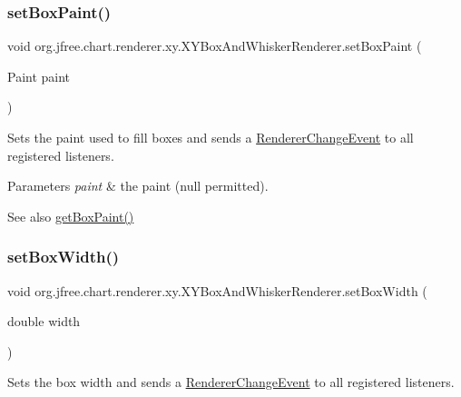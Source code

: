 \subsubsection{\texorpdfstring{set\+Box\+Paint()}{setBoxPaint()}}
{\footnotesize\ttfamily void org.\+jfree.\+chart.\+renderer.\+xy.\+X\+Y\+Box\+And\+Whisker\+Renderer.\+set\+Box\+Paint (\begin{DoxyParamCaption}\item[{Paint}]{paint }\end{DoxyParamCaption})}

Sets the paint used to fill boxes and sends a \mbox{\hyperlink{}{Renderer\+Change\+Event}} to all registered listeners.


\begin{DoxyParams}{Parameters}
{\em paint} & the paint ({\ttfamily null} permitted).\\
\hline
\end{DoxyParams}
\begin{DoxySeeAlso}{See also}
\mbox{\hyperlink{classorg_1_1jfree_1_1chart_1_1renderer_1_1xy_1_1_x_y_box_and_whisker_renderer_a0ee3c33a3c41cc5604874f12a26e16f7}{get\+Box\+Paint()}} 
\end{DoxySeeAlso}
\mbox{\label{classorg_1_1jfree_1_1chart_1_1renderer_1_1xy_1_1_x_y_box_and_whisker_renderer_a315ca989a335f58c5d08019fb3f519f8}} 
\subsubsection{\texorpdfstring{set\+Box\+Width()}{setBoxWidth()}}
{\footnotesize\ttfamily void org.\+jfree.\+chart.\+renderer.\+xy.\+X\+Y\+Box\+And\+Whisker\+Renderer.\+set\+Box\+Width (\begin{DoxyParamCaption}\item[{double}]{width }\end{DoxyParamCaption})}

Sets the box width and sends a \mbox{\hyperlink{}{Renderer\+Change\+Event}} to all registered listeners. 


